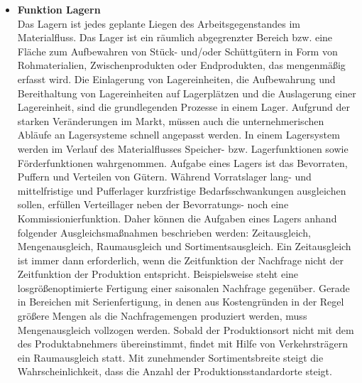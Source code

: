 \begin{itemize}
\item \textbf{Funktion Lagern} \\
Das Lagern ist jedes geplante Liegen des Arbeitsgegenstandes im Materialfluss.
Das Lager ist ein r\"aumlich abgegrenzter Bereich bzw. eine Fl\"ache zum Aufbewahren von St\"uck- und/oder 
Sch\"uttg\"utern in Form von Rohmaterialien, Zwischenprodukten oder Endprodukten, das mengenm\"a\ss ig erfasst wird\cite{VDI:1978}.
Die Einlagerung von Lagereinheiten, die Aufbewahrung und Bereithaltung von La\-ger\-ein\-hei\-ten auf Lagerpl\"atzen 
und die Auslagerung einer Lagereinheit, sind die grundlegenden Prozesse in einem Lager.
Aufgrund der starken Ver\"anderungen im Markt, m\"ussen auch die unternehmerischen Abl\"aufe an Lagersysteme schnell angepasst werden.
In einem Lagersystem werden im Verlauf des Materialflusses Speicher- bzw. Lagerfunktionen sowie F\"orderfunktionen wahrgenommen. 
Aufgabe eines Lagers ist das Bevorraten, Puffern und Verteilen von G\"utern.
W\"ahrend Vorratslager lang- und mittelfristige und Pufferlager kurzfristige Bedarfsschwankungen ausgleichen sollen, erf\"ullen 
Verteillager neben der Bevorratungs- noch eine Kommissionierfunktion.
Daher k\"onnen die Aufgaben eines Lagers anhand folgender Ausgleichsma\ss nahmen beschrieben werden:
Zeitausgleich, Mengenausgleich, Raumausgleich und Sortimentsausgleich\cite{Stich:Bruckner:2002}.
Ein Zeitausgleich ist immer dann erforderlich, wenn die Zeitfunktion der Nachfrage nicht der Zeitfunktion der Produktion entspricht.
Beispielsweise steht eine losgr\"o\ss enoptimierte Fertigung einer saisonalen Nachfrage gegen\"uber.
Gerade in Bereichen mit Serienfertigung, in denen aus Kostengr\"unden in der Regel gr\"o\ss ere Mengen als die Nachfragemengen 
produziert werden, muss Mengenausgleich vollzogen werden.
Sobald der Produktionsort nicht mit dem des Produktabnehmers \"ubereinstimmt, findet mit Hilfe von Verkehrstr\"agern ein Raumausgleich statt.
Mit zunehmender Sortimentsbreite steigt die Wahrscheinlichkeit, dass die Anzahl der Produktionsstandardorte steigt\cite[S. 14]{Langenbach:2012}.


\end{itemize}
